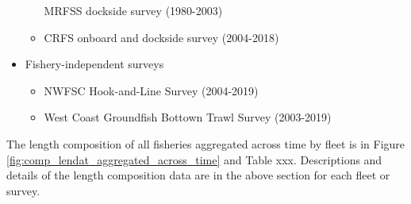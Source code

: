 \documentclass[11pt,
  english,
  a4paper,
]{article}
\begin{document}
\begin{itemize}
\begin{itemize}

    MRFSS dockside survey (1980-2003)

    \tagmcend\tagstructend\tagstructend

    \tagmcend\tagstructend\tagstructend
  \item


    CRFS onboard and dockside survey (2004-2018)

    \tagmcend\tagstructend\tagstructend

    \tagmcend\tagstructend\tagstructend
  \end{itemize}

  \tagstructend
\item

  Fishery-independent surveys

  \tagmcend\tagstructend\tagstructend


  \begin{itemize}
  \item


    NWFSC Hook-and-Line Survey (2004-2019)

    \tagmcend\tagstructend\tagstructend

    \tagmcend\tagstructend\tagstructend
  \item


    West Coast Groundfish Bottown Trawl Survey (2003-2019)

    \tagmcend\tagstructend\tagstructend

    \tagmcend\tagstructend\tagstructend
  \end{itemize}

  \tagstructend
\end{itemize}

\tagstructend

The length composition of all fisheries aggregated across time by fleet is in Figure \ref{fig:comp_lendat_aggregated_across_time} and Table xxx. Descriptions and details of the length composition data are in the above section for each fleet or survey.
\end{document}
